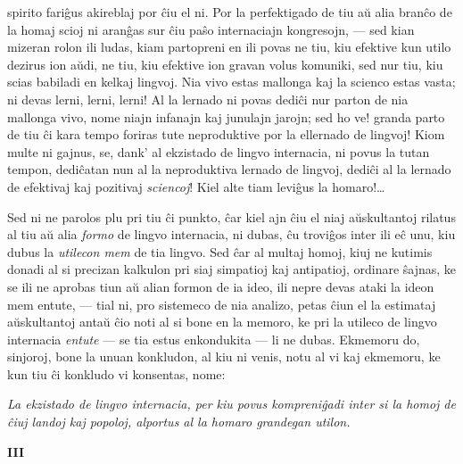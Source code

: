spirito fari\^gus akireblaj por \^ciu el ni. Por la perfektigado de
tiu a\u u alia bran\^co de la homaj scioj ni aran\^gas sur \^ciu
pa\^so internaciajn kongresojn, --- sed kian mizeran rolon ili
ludas, kiam partopreni en ili povas ne tiu, kiu efektive kun utilo
dezirus ion a\u udi, ne tiu, kiu efektive ion gravan volus komuniki,
sed nur tiu, kiu scias babiladi en kelkaj lingvoj. Nia vivo estas
mallonga kaj la scienco estas vasta; ni devas lerni, lerni, lerni!
Al la lernado ni povas dedi\^ci nur parton de nia mallonga vivo,
nome niajn infanajn kaj junulajn jarojn; sed ho ve! granda parto de
tiu \^ci kara tempo foriras tute neproduktive por la ellernado de
lingvoj! Kiom multe ni gajnus, se, dank' al ekzistado de lingvo
internacia, ni povus la tutan tempon, dedi\^catan nun al la
neproduktiva lernado de lingvoj, dedi\^ci al la lernado de efektivaj
kaj pozitivaj {\sl sciencoj}! Kiel alte tiam levi\^gus la
homaro!\dots

   Sed ni ne parolos plu pri tiu \^ci punkto, \^car kiel ajn \^ciu el niaj
a\u uskultantoj rilatus al tiu a\u u alia {\sl formo} de lingvo
internacia, ni dubas, \^cu trovi\^gos inter ili e\^c unu, kiu dubus
la {\sl utilecon mem} de tia lingvo. Sed \^car al multaj homoj, kiuj
ne kutimis donadi al si precizan kalkulon pri siaj simpatioj kaj
antipatioj, ordinare \^sajnas, ke se ili ne aprobas tiun a\u u alian
formon de ia ideo, ili nepre devas ataki la ideon mem entute,
--- tial ni, pro sistemeco de nia analizo, petas \^ciun el la
estimataj a\u uskultantoj anta\u u \^cio noti al si bone en la
memoro, ke pri la utileco de lingvo internacia {\sl entute} --- se
tia estus enkondukita --- li ne dubas. Ekmemoru do, sinjoroj, bone
la unuan konkludon, al kiu ni venis, notu al vi kaj ekmemoru, ke kun
tiu \^ci konkludo vi konsentas, nome:

   \emph{La ekzistado de lingvo internacia, per kiu povus kompreni\^gadi
   inter si la homoj de \^ciuj landoj kaj popoloj, alportus al la
   homaro grandegan utilon.}

\begin{center}
\textbf{III}
\end{center}


